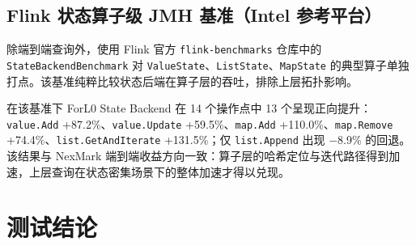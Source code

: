 \documentclass[a4paper,11pt]{article}
\newcommand{\project}{ForL0 State Backend}
\begin{document}
\subsection{Flink 状态算子级 JMH 基准（Intel 参考平台）}

除端到端查询外，使用 Flink 官方 \texttt{flink-benchmarks} 仓库中的 \texttt{StateBackendBenchmark} 对 \texttt{ValueState}、\texttt{ListState}、\texttt{MapState} 的典型算子单独打点。该基准纯粹比较状态后端在算子层的吞吐，排除上层拓扑影响。


在该基准下 \project{} 在 14 个操作点中 13 个呈现正向提升：\texttt{value.Add} +87.2\%、\texttt{value.Update} +59.5\%、\texttt{map.Add} +110.0\%、\texttt{map.Remove} +74.4\%、\texttt{list.GetAndIterate} +131.5\%；仅 \texttt{list.Append} 出现 $-$8.9\% 的回退。该结果与 NexMark 端到端收益方向一致：算子层的哈希定位与迭代路径得到加速，上层查询在状态密集场景下的整体加速才得以兑现。

\section{测试结论}
\end{document}
